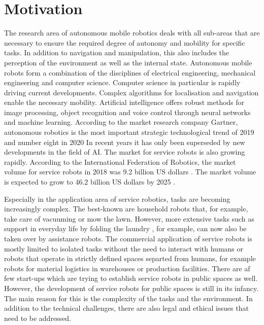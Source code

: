 \section{Motivation}
\label{sec:motivation}
The research area of autonomous mobile robotics deals with all sub-areas that are necessary to ensure the required degree of autonomy and mobility for specific tasks. In addition to navigation and manipulation, this also includes the perception of the environment as well as the internal state. Autonomous mobile robots form a combination of the disciplines of electrical engineering, mechanical engineering and computer science. Computer science in particular is rapidly driving current developments. Complex algorithms for localisation and navigation enable the necessary mobility. Artificial intelligence offers robust methods for image processing, object recognition and voice control through neural networks and machine learning.  According to the market research company Gartner, autonomous robotics is the most important strategic technological trend of 2019 \cite{Cearley.2018} and number eight in 2020  In recent years it has only been superseded by new developments in the field of AI. The market for service robots is also growing rapidly.  According to the International Federation of Robotics, the market volume for service robots in 2018 was 9.2 billion US dollars \cite{InternationalFederationofRobotics.2019}. The market volume is expected to grow to 46.2 billion US dollars by 2025 \cite{InternationalFederationofRobotics.2019}.

Especially in the application area of service robotics, tasks are becoming increasingly complex. The best-known are household robots that, for example, take care of vacuuming or mow the lawn. However, more extensive tasks such as support in everyday life by folding the laundry , for example, can now also be taken over by assistance robots. The commercial application of service robots is mostly limited to isolated tasks without the need to interact with humans or robots that operate in strictly defined spaces separted from humans, for example robots for material logistics in warehouses or production facilities. There are af few start-ups which are trying to establish service robots in public spaces as well. However, the development of service robots for public spaces is still in its infancy. The main reason for this is the complexity of the tasks and the environment. In addition to the technical challenges, there are also legal and ethical issues that need to be addressed.

